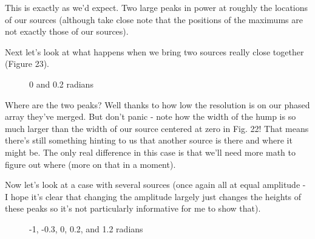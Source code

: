 \documentclass[10pt,a4paper]{article}
\begin{document}
This is exactly as we'd expect. Two large peaks in power at roughly the locations of our sources (although take close note that the positions of the maximums are not exactly those of our sources). 

Next let's look at what happens when we bring two sources really close together (Figure 23).

\begin{figure}[!htb]
\caption{\label{fig:my-label} 0 and 0.2 radians}
\end{figure}

Where are the two peaks? Well thanks to how low the resolution is on our phased array they've merged. But don't panic - note how the width of the hump is so much larger than the width of our source centered at zero in Fig. 22! That means there's still something hinting to us that another source is there and where it might be. The only real difference in this case is that we'll need more math to figure out where (more on that in a moment). 

Now let's look at a case with several sources (once again all at equal amplitude - I hope it's clear that changing the amplitude largely just changes the heights of these peaks so it's not particularly informative for me to show that). 

\begin{figure}[!htb]
\caption{\label{fig:my-label} -1, -0.3, 0, 0.2, and 1.2 radians}
\end{figure}
\end{document}
